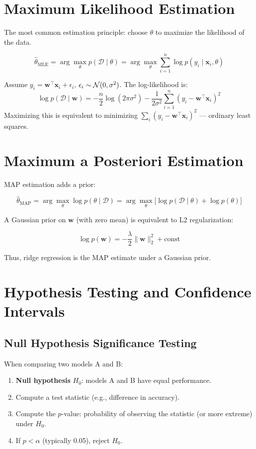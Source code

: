 \section{Maximum Likelihood Estimation}

The most common estimation principle: choose $\theta$ to maximize the likelihood of the data.

\[
	\hat{\theta}_{\text{MLE}} = \arg\max_\theta p(\mathcal{D} \mid \theta) = \arg\max_\theta \sum_{i=1}^n \log p(y_i \mid \mathbf{x}_i, \theta)
\]

\begin{example}
	Assume $y_i = \mathbf{w}^\top \mathbf{x}_i + \epsilon_i$, $\epsilon_i \sim \mathcal{N}(0, \sigma^2)$. The log-likelihood is:
	\[
		\log p(\mathcal{D} \mid \mathbf{w}) = -\frac{n}{2} \log(2\pi\sigma^2) - \frac{1}{2\sigma^2} \sum_{i=1}^n (y_i - \mathbf{w}^\top \mathbf{x}_i)^2
	\]
	Maximizing this is equivalent to minimizing $\sum_i (y_i - \mathbf{w}^\top \mathbf{x}_i)^2$ --- ordinary least squares.
\end{example}

\section{Maximum a Posteriori Estimation}

MAP estimation adds a prior:

\[
	\hat{\theta}_{\text{MAP}} = \arg\max_\theta \log p(\theta \mid \mathcal{D}) = \arg\max_\theta \big[\log p(\mathcal{D} \mid \theta) + \log p(\theta)\big]
\]

A Gaussian prior on $\mathbf{w}$ (with zero mean) is equivalent to L2 regularization:

\[
	\log p(\mathbf{w}) = -\frac{\lambda}{2} \|\mathbf{w}\|_2^2 + \text{const}
\]

Thus, ridge regression is the MAP estimate under a Gaussian prior.

\section{Hypothesis Testing and Confidence Intervals}

\subsection{Null Hypothesis Significance Testing}

When comparing two models A and B:

\begin{enumerate}
	\item \textbf{Null hypothesis} $H_0$: models A and B have equal performance.
	\item Compute a test statistic (e.g., difference in accuracy).
	\item Compute the $p$-value: probability of observing the statistic (or more extreme) under $H_0$.
	\item If $p < \alpha$ (typically 0.05), reject $H_0$.
\end{enumerate}

